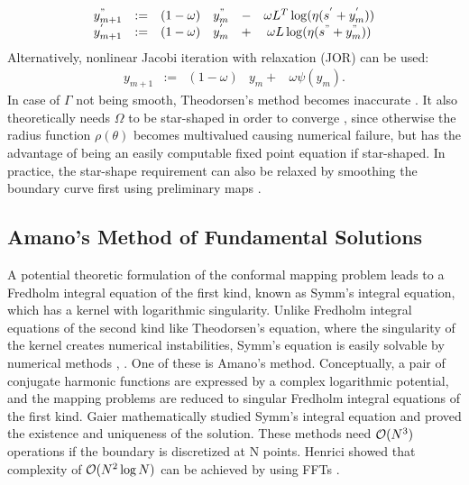 \begin{equation}\label{eq:SOR}
    \begin{matrix}
        y_{m+1}^{"} &:= &(1-\omega)&y_m^{"} &- &\omega L^T \log(\eta(s^{'} + y_m^{'})) \\
        y_{m+1}^{'} &:= &(1-\omega)&y_m^{'} &+ &\omega L \log(\eta(s^{"} + y_m^{"}))        
    \end{matrix}
\end{equation}
Alternatively, nonlinear Jacobi iteration with relaxation (JOR) can be used:
\begin{equation}\label{eq:JOR}
    \begin{matrix}
        y_{m+1} &:= &(1-\omega)&y_m + &\omega \psi(y_m).
    \end{matrix}
\end{equation}
\fi
In case of $\Gamma$ not being smooth, Theodorsen's method becomes inaccurate \cite{Gutknecht1983_theodorsen_equation_FFT}.
It also theoretically needs $\Omega$ to be star-shaped in order to converge \cite{Wegmann1978_newtonverfahren}, since otherwise the radius function $\rho(\theta)$ becomes multivalued causing numerical failure, but has the advantage of being an easily computable fixed point equation if star-shaped. 
In practice, the star-shape requirement can also be relaxed by smoothing the boundary curve first using preliminary maps \cite{Gutknecht1983_theodorsen_equation_FFT}.

\subsection{Amano's Method of Fundamental Solutions} \label{chap:AmanosMethod}
A potential theoretic formulation of the conformal mapping problem leads to a Fredholm integral equation of the first kind, known as Symm's integral equation, which has a kernel with logarithmic singularity. 
Unlike Fredholm integral equations of the second kind like Theodorsen's equation, where the singularity of the kernel creates numerical instabilities, Symm's equation is easily solvable by numerical methods \cite[Chapter 9.1]{Kythe1998_symmsintegralequation}, \cite[Chapter 3.1]{Wegmann2005_num_methods_confmapping}. One of these is Amano's method.
Conceptually, a pair of conjugate harmonic functions are expressed by a complex logarithmic potential, and the mapping problems are reduced to singular Fredholm integral equations of the ﬁrst kind. Gaier \cite{Gaier1964} mathematically studied Symm’s integral equation and proved the existence and uniqueness of the solution. These methods need $\mathcal{O}(N^3)$ operations if the boundary is discretized at N points. Henrici showed that complexity of $\mathcal{O}(N^2\log N)$ can be achieved by using FFTs \cite{Henrici1986_vol3}.

